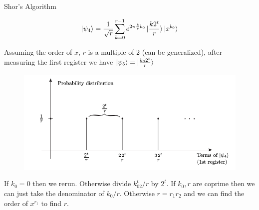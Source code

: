 \documentclass{beamer}
\begin{document}
\begin{frame}{Shor's Algorithm}




{\small

\[
\ket{\psi_4}=\frac{1}{\sqrt{r}}\sum_{k=0}^{r-1}e^{2\pi \frac{k}{r}b_0}\ket{\frac{k2^t}{r}}\ket{x^{b_0}}
\]

Assuming the order of $x$, $r$ is a multiple of 2 (can be generalized), after measuring the first register we have $\ket{\psi_5}=\ket{\frac{k_0 2^t}{r}}$

\begin{figure}[ht]
  \includegraphics[scale=.45]{pasted6}
\end{figure}

If $k_0=0$ then we rerun. Otherwise divide $k_02^t/r$  by $2^t$. If $k_0,r$ are coprime then we can just take the denominator of $k_0/r$. Otherwise $r=r_1 r_2$ and we can find the order of $x^{r_1}$ to find $r$.
}
\end{frame}
\end{document}

